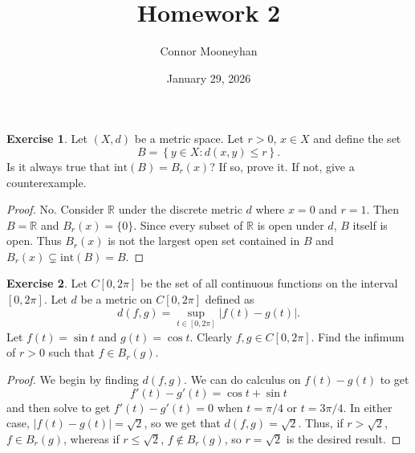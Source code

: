 \documentclass[12pt]{article}
\title{Homework 2}
\author{Connor Mooneyhan}
\date{January 29, 2026}
\theoremstyle{definition}
\newtheorem{ex}{Exercise}
\begin{document}
\maketitle

\begin{ex}
	Let $(X, d)$ be a metric space.
	Let $r > 0$, $x \in X$ and define the set \begin{equation*}
		B = \left\lbrace y \in X : d(x, y) \leq r \right\rbrace.
	\end{equation*}
	Is it always true that $\mathrm{int}(B) = B_r(x)$?
	If so, prove it.
	If not, give a counterexample.
\end{ex}
\begin{proof}
	No.
	Consider $\mathbb{R}$ under the discrete metric $d$ where $x = 0$ and $r = 1$.
	Then $B = \mathbb{R}$ and $B_r(x) = \lbrace 0 \rbrace$.
	Since every subset of $\mathbb{R}$ is open under $d$, $B$ itself is open.
	Thus $B_r(x)$ is not the largest open set contained in $B$ and $B_r(x) \subsetneq \mathrm{int}(B) = B$.
\end{proof}

\begin{ex}
	Let $C[0, 2\pi]$ be the set of all continuous functions on the interval $[0, 2\pi]$.
	Let $d$ be a metric on $C[0, 2\pi]$ defined as \begin{equation*}
		d(f, g) = \sup_{t \in [0, 2\pi]} |f(t) - g(t)|.
	\end{equation*}
	Let $f(t) = \sin t$ and $g(t) = \cos t$.
	Clearly $f, g \in C[0, 2\pi]$.
	Find the infimum of $r > 0$ such that $f \in B_r(g)$.
\end{ex}
\begin{proof}
	We begin by finding $d(f,g)$.
	We can do calculus on $f(t) - g(t)$ to get \begin{equation*}
		f'(t) - g'(t) = \cos t + \sin t
	\end{equation*}
	and then solve to get $f'(t) - g'(t) = 0$ when $t = \pi/4$ or $t = 3\pi/4$.
	In either case, $|f(t) - g(t)| = \sqrt 2$, so we get that $d(f, g) = \sqrt 2$.
	Thus, if $r > \sqrt 2$, $f \in B_r(g)$, whereas if $r \leq \sqrt 2$, $f \notin B_r(g)$, so $r = \sqrt 2$ is the desired result.
\end{proof}
\end{document}
